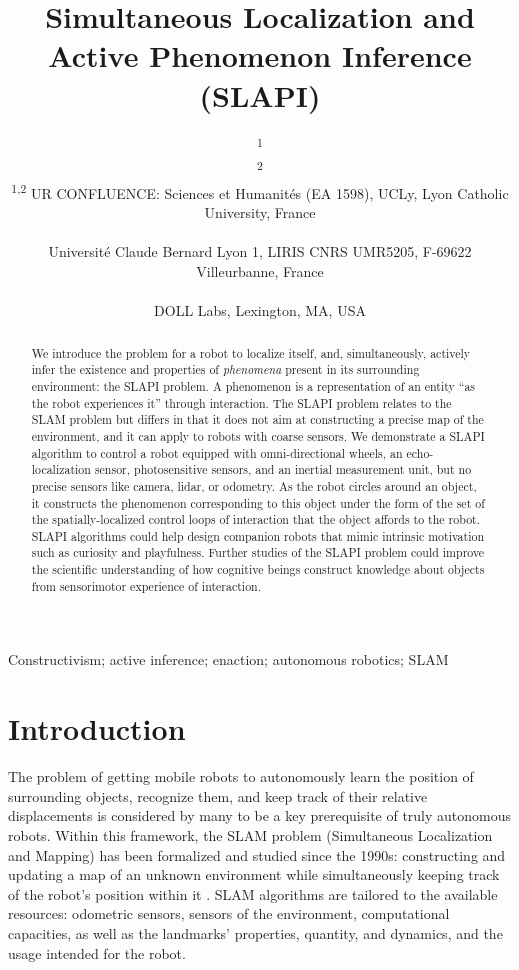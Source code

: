 \documentclass[pmlr]{jmlr}%
\title[SLAPI]{Simultaneous Localization and Active Phenomenon Inference (SLAPI)}
\author{\Name{Olivier L. Georgeon}\textsuperscript{1} \Email{ogeorgeon@univ-catholyon.fr}\\
  \Name{Juan R. Vidal}\textsuperscript{2} \Email{jvidal@univ-catholyon.fr}\\
  \addr \textsuperscript{1,2} UR CONFLUENCE: Sciences et Humanités (EA 1598), UCLy, Lyon Catholic University, France\\
  \Name{Titouan Knockaert} \Email{titouan.knockaert@gmail.com}\\
  \addr Université Claude Bernard Lyon 1, LIRIS CNRS UMR5205, F-69622 Villeurbanne, France\\
  \Name{Paul Robertson} \Email{paulr@dollabs.com}\\
  \addr DOLL Labs, Lexington, MA, USA\\
}
\begin{document}
\maketitle

\begin{abstract}
We introduce the problem for a robot to  localize itself, and, simultaneously, actively infer the existence and properties of \textit{phenomena} present in its surrounding environment: the SLAPI problem. 
A phenomenon is a representation of an entity ``as the robot experiences it'' through interaction. 
The SLAPI problem relates to the SLAM problem but differs in that it does not aim at constructing a precise map of the environment, and it can apply to robots with coarse sensors. 
We demonstrate a SLAPI algorithm to control a robot equipped with omni-directional wheels, an echo-localization sensor, photosensitive sensors, and an inertial measurement unit, but no precise sensors like camera, lidar, or odometry. 
As the robot circles around an object, it constructs the phenomenon corresponding to this object under the form of the set of the spatially-localized control loops of interaction that the object affords to the robot. 
SLAPI algorithms could help design companion robots that mimic intrinsic motivation such as curiosity and playfulness. 
Further studies of the SLAPI problem could improve the scientific understanding of how cognitive beings construct knowledge about objects from sensorimotor experience of interaction.
\end{abstract}

\begin{keywords}
Constructivism; active inference; enaction; autonomous robotics; SLAM
\end{keywords}

\section{Introduction}
\label{sec:intro}

The problem of getting mobile robots to autonomously learn the position of surrounding objects, recognize them, and keep track of their relative displacements is considered by many to be a key prerequisite of truly autonomous robots. 
Within this framework, the SLAM problem (Simultaneous Localization and Mapping) has been formalized and studied since the 1990s: constructing and updating a map of an unknown environment while simultaneously keeping track of the robot's position within it \citep[e.g.,][]{taketomi_visual_2017}.
SLAM algorithms are tailored to the available resources: odometric sensors, sensors of the environment, computational capacities, as well as the landmarks' properties, quantity, and dynamics, and the usage intended for the robot.
\end{document}
